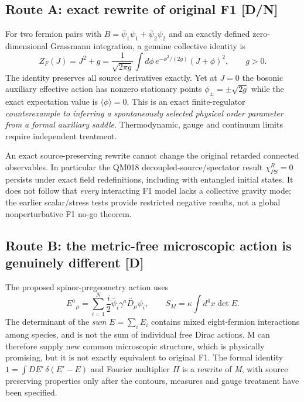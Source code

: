 \documentclass[11pt,a4paper]{article}
\begin{document}
\subsection{Route A: exact rewrite of original F1 [D/N]}
\label{sec:v14-routeA}
For two fermion pairs with $B=\bar\psi_1\psi_1+\bar\psi_2\psi_2$ and an exactly defined zero-dimensional Grassmann integration, a genuine collective identity is
\begin{equation}\label{eq:v14-HS}
\boxed{Z_F(J)=J^2+g=\frac1{\sqrt{2\pi g}}\int d\phi\,e^{-\phi^2/(2g)}(J+\phi)^2,\qquad g>0.}
\end{equation}
The identity preserves all source derivatives exactly. Yet at $J=0$ the bosonic auxiliary effective action has nonzero stationary points $\phi_\pm=\pm\sqrt{2g}$ while the exact expectation value is $\langle\phi\rangle=0$. This is an exact finite-regulator \emph{counterexample to inferring a spontaneously selected physical order parameter from a formal auxiliary saddle}. Thermodynamic, gauge and continuum limits require independent treatment.

An exact source-preserving rewrite cannot change the original retarded connected observables. In particular the QM018 decoupled-source/spectator result $\chi^R_{PS}=0$ persists under exact field redefinitions, including with entangled initial states. It does not follow that \emph{every} interacting F1 model lacks a collective gravity mode; the earlier scalar/stress tests provide restricted negative results, not a global nonperturbative F1 no-go theorem.

\subsection{Route B: the metric-free microscopic action is genuinely different [D]}
\label{sec:v14-routeB}
The proposed spinor-pregeometry action uses
\begin{equation}\label{eq:v14-composite}
\boxed{E^a{}_{\mu}=\sum_{i=1}^N\frac i2\bar\psi_i\gamma^a\overleftrightarrow{D_\mu}\psi_i,\qquad S_M=\kappa\int d^4x\det E.}
\end{equation}
The determinant of the \emph{sum} $E=\sum_i E_i$ contains mixed eight-fermion interactions among species, and is not the sum of individual free Dirac actions. M can therefore supply new common microscopic structure, which is physically promising, but it is not exactly equivalent to original F1. The formal identity $1=\int DE'\,\delta(E'-E)$ and Fourier multiplier $\Pi$ is a rewrite of \emph{M}, with source preserving properties only after the contours, measures and gauge treatment have been specified.
\end{document}
